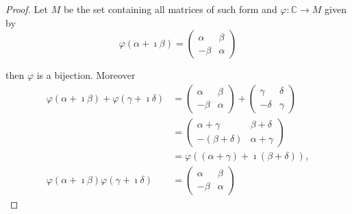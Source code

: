 \begin{proof}
	Let \( M \) be the set containing all matrices of such form and \( \varphi: \mathbb{C} \to M \) given by
	\[
		\varphi(\alpha + \imath\beta) = \begin{pmatrix}
			\alpha & \beta  \\
			-\beta & \alpha
		\end{pmatrix}
	\]

	then \( \varphi \) is a bijection. Moreover
	\begingroup
	\allowdisplaybreaks%
	\begin{align*}
		\varphi(\alpha + \imath\beta) + \varphi(\gamma + \imath\delta) & = \begin{pmatrix}
			                                                                   \alpha & \beta  \\
			                                                                   -\beta & \alpha
		                                                                   \end{pmatrix} + \begin{pmatrix}
			                                                                                   \gamma  & \delta \\
			                                                                                   -\delta & \gamma
		                                                                                   \end{pmatrix}                            \\
		                                                               & = \begin{pmatrix}
			                                                                   \alpha + \gamma   & \beta + \delta  \\
			                                                                   -(\beta + \delta) & \alpha + \gamma
		                                                                   \end{pmatrix}                         \\
		                                                               & = \varphi((\alpha + \gamma) + \imath(\beta + \delta)),        \\
		\varphi(\alpha + \imath\beta)\varphi(\gamma + \imath\delta)    & = \begin{pmatrix}
			                                                                   \alpha & \beta  \\
			                                                                   -\beta & \alpha

\end{pmatrix}
\end{align*}
\end{proof}
